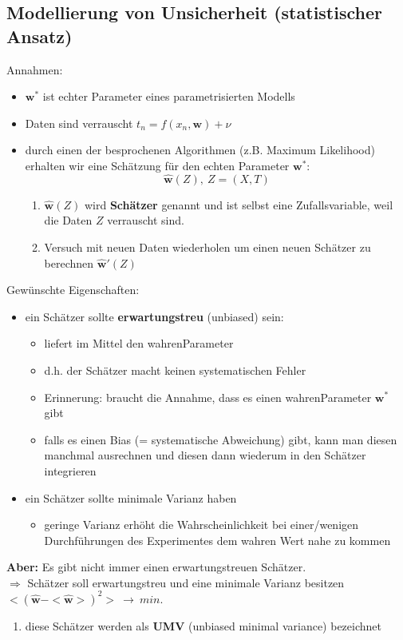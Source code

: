 	\subsection{Modellierung von Unsicherheit (statistischer Ansatz)}
	Annahmen:
	\begin{itemize}
		\item $\pmb{w^*}$ ist echter Parameter eines parametrisierten Modells
		\item Daten sind verrauscht $t_n=f(x_n,\pmb{w})+\nu$
		\item durch einen der besprochenen Algorithmen (z.B. Maximum Likelihood) erhalten wir eine Schätzung für den echten Parameter $\pmb{w^*}$:
		\begin{equation*}
			\pmb{\hat{w}}(Z),~Z=(X,T)
		\end{equation*}\vspace*{-20pt}
		\begin{enumerate}[$\hookrightarrow$]
			\item $\pmb{\hat{w}}(Z)$ wird \textbf{Schätzer} genannt und ist selbst eine Zufallsvariable, weil die Daten $Z$ verrauscht sind.
			\item Versuch mit neuen Daten wiederholen um einen neuen Schätzer zu berechnen $\pmb{\hat{w}'}(Z)$
		\end{enumerate}
	\end{itemize}
	Gewünschte Eigenschaften:
	\begin{itemize}
		\item ein Schätzer sollte \textbf{erwartungstreu} (unbiased) sein:
		\begin{itemize}
			\item liefert im Mittel den \dq wahren\dq Parameter
			\item d.h. der Schätzer macht keinen systematischen Fehler
			\item Erinnerung: braucht die Annahme, dass es einen \dq wahren\dq Parameter $\pmb{w^*}$ gibt
			\item falls es einen Bias (= systematische Abweichung) gibt, kann man diesen manchmal ausrechnen und diesen dann wiederum in den Schätzer integrieren
		\end{itemize}
		\item ein Schätzer sollte minimale Varianz haben
		\begin{itemize}
			\item geringe Varianz erhöht die Wahrscheinlichkeit bei einer/wenigen Durchführungen des Experimentes dem wahren Wert nahe zu kommen
		\end{itemize}
	\end{itemize}
	\textbf{Aber:} Es gibt nicht immer einen erwartungstreuen Schätzer.\\[5pt]
	$\Rightarrow$ Schätzer soll erwartungstreu und eine minimale Varianz besitzen\\\hspace*{10pt} $<(\pmb{\hat{w}}-<\pmb{\hat{w}}>)^2> ~\rightarrow ~min$.\vspace*{-5pt}
	\begin{enumerate}[$\hookrightarrow$]
		\item diese Schätzer werden als \textbf{UMV} (unbiased minimal variance) bezeichnet
	\end{enumerate}
